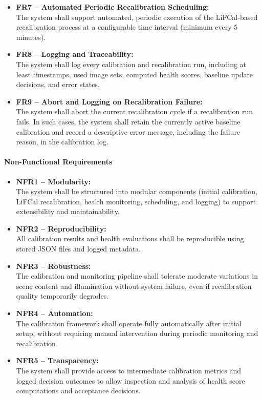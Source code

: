 \documentclass[12pt]{scrartcl}
\begin{document}
\begin{itemize}
  \item \textbf{FR7 – Automated Periodic Recalibration Scheduling:} \\
  The system shall support automated, periodic execution of the LiFCal-based recalibration process at a configurable time interval (minimum every 5 minutes).

  \item \textbf{FR8 – Logging and Traceability:} \\
  The system shall log every calibration and recalibration run, including at least timestamps, used image sets, computed health scores, baseline update decisions, and error states.
  
  \item \textbf{FR9 – Abort and Logging on Recalibration Failure:} \\ The system shall abort the current recalibration cycle if a recalibration run fails. In such cases, the system shall retain the currently active baseline calibration and record a descriptive error message, including the failure reason, in the calibration log.
\end{itemize}

\paragraph{Non-Functional Requirements}
\begin{itemize}
 \item \textbf{NFR1 – Modularity:} \\
  The system shall be structured into modular components
  (initial calibration, LiFCal recalibration, health monitoring, scheduling, and logging) to support extensibility and maintainability.

  \item \textbf{NFR2 – Reproducibility:} \\
  All calibration results and health evaluations shall be reproducible using stored JSON files and logged metadata.

  \item \textbf{NFR3 – Robustness:} \\
  The calibration and monitoring pipeline shall tolerate moderate variations in scene content and illumination without system failure, even if recalibration quality temporarily degrades.

  \item \textbf{NFR4 – Automation:} \\
  The calibration framework shall operate fully automatically
  after initial setup, without requiring manual intervention
  during periodic monitoring and recalibration.

  \item \textbf{NFR5 – Transparency:} \\
  The system shall provide access to intermediate calibration metrics and logged decision outcomes to allow inspection and analysis of health score computations and acceptance decisions.
\end{itemize}
\end{document}
